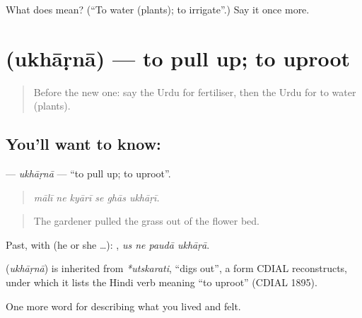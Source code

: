 \begin{tcolorbox}[breakable,colback=teal!4,colframe=teal!35!black,title={Before you move on}]
What does  mean? (\textquotedblleft{}To water (plants); to irrigate\textquotedblright{}.) Say it once more.
\end{tcolorbox}
\section[\texorpdfstring{\ur{اکھاڑنا} (ukhāṛnā)}{اکھاڑنا (ukhāṛnā)}]{ (ukhāṛnā) — to pull up; to uproot}

\label{lesson:UR-C512-ukharna-uproot}



\begin{quote}
Before the new one: say the Urdu for fertiliser, then the Urdu for to water (plants).
\end{quote}

\subsection*{You'll want to know: }
\textbf{} — \emph{ukhāṛnā} — \textquotedblleft{}to pull up; to uproot\textquotedblright{}.

\begin{quote}
     
\end{quote}

\begin{quote}
\emph{mālī ne kyārī se ghās ukhāṛī.}
\end{quote}

\begin{quote}
The gardener pulled the grass out of the flower bed.
\end{quote}

Past, with  (he or she …):    , \emph{us ne paudā ukhāṛā}.

\begin{cousinweb}
\textbf{} (\emph{ukhāṛnā}) is inherited from \emph{*utskarati}, \textquotedblleft{}digs out\textquotedblright{}, a form CDIAL reconstructs, under which it lists the Hindi verb meaning \textquotedblleft{}to uproot\textquotedblright{} (CDIAL 1895).
\end{cousinweb}

\begin{grammarlens}[title={What you've built}]
One more word for describing what you lived and felt.
\end{grammarlens}

